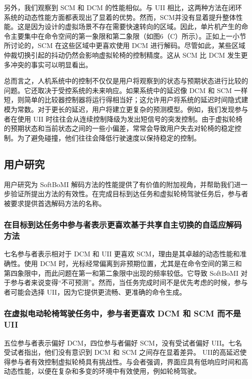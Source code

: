 另外，我们观察到 SCM 和 DCM 的性能相似。与 UII 相比，这两种方法在闭环系统的动态性能方面都表现出了显着的优势。然而，SCM并没有显着提升整体性能。这是因为设计的虚拟场景不存在需要快速转向的区域。因此，单片机产生的命令主要集中在命令空间的第一象限和第二象限（如图6（C）所示）。正如上一小节所讨论的，SCM 在这些区域中更喜欢使用 DCM 进行解码。尽管如此，某些区域仲裁切换引起的抖动仍然会影响虚拟轮椅的控制精度。这从 SCM 比 DCM 发生更多冲突的事实可以明显看出。  

总而言之，人机系统中的控制不仅仅是用户将观察到的状态与预期状态进行比较的问题。它还取决于受控系统的未来响应。如果系统中的延迟像 DCM 和 SCM 一样短，则简单的比较器控制器将运行得相当好；这允许用户将系统的延迟时间隐式建模为常数。对于更长的延迟，用户将建立更复杂的预测模型。例如，我们发现参与者在使用 UII 时往往会从连续控制降级为发出短信号的突发控制。由于虚拟轮椅的预期状态和当前状态之间的一些小偏差，常常会导致用户失去对轮椅的稳定控制。为了避免碰撞，他们往往会降低行驶速度以保持稳定的控制。  

\subsection{用户研究}用户研究为 SoftBoMI 解码方法的性能提供了有价值的附加视角，并帮助我们进一步验证所提出方法的有效性。在完成目标到达任务和虚拟轮椅驾驶任务后，参与者被要求提供首选解码方法的名称。  

\subsubsection{在目标到达任务中参与者表示更喜欢基于共享自主切换的自适应解码方法}七名参与者表示相对于 DCM 和 UII 更喜欢 SCM，理由是其卓越的动态性能和准确性。使用 DCM 时，光标经常偏离到非预期位置，尤其是在命令空间的第三和第四象限中，而此问题在第一和第二象限中出现的频率较低。它导致 SoftBoMI 对于参与者来说变得“不可预测”。然而，当任务完成时间不是优先考虑的时候，参与者可能会选择 UII，因为它提供更流畅、更准确的命令生成。  

\subsubsection{在虚拟电动轮椅驾驶任务中，参与者更喜欢 DCM 和 SCM 而不是 UII  }    五位参与者表示偏好 DCM，四位参与者偏好 SCM，没有受试者偏好 UII。七名受试者指出，他们没有意识到 DCM 和 SCM 之间存在显着差异。 UII的高延迟使得参与者有效控制虚拟轮椅具有挑战性。与会者强调，界面应具有低响应时间和高动态性能，以便在复杂和多变的环境中有效使用，例如轮椅驾驶。


